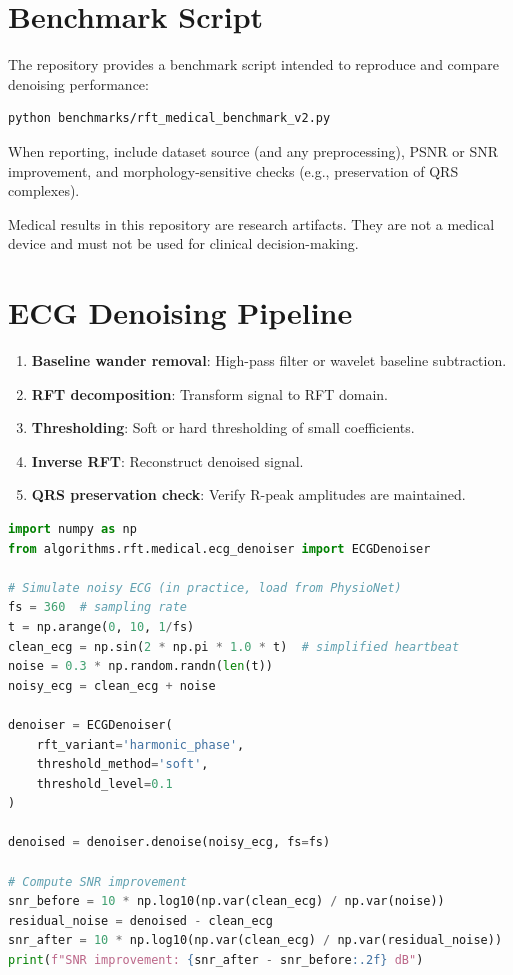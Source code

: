 \documentclass[11pt, a4paper, openany]{book}
\theoremstyle{definition}
\begin{document}
\section{Benchmark Script}
The repository provides a benchmark script intended to reproduce and compare denoising performance:
\begin{verbatim}
python benchmarks/rft_medical_benchmark_v2.py
\end{verbatim}
When reporting, include dataset source (and any preprocessing), PSNR or SNR improvement, and morphology-sensitive checks (e.g., preservation of QRS complexes).

\begin{warningbox}
Medical results in this repository are research artifacts. They are not a medical device and must not be used for clinical decision-making.
\end{warningbox}

\section{ECG Denoising Pipeline}
\begin{enumerate}
    \item \textbf{Baseline wander removal}: High-pass filter or wavelet baseline subtraction.
    \item \textbf{RFT decomposition}: Transform signal to RFT domain.
    \item \textbf{Thresholding}: Soft or hard thresholding of small coefficients.
    \item \textbf{Inverse RFT}: Reconstruct denoised signal.
    \item \textbf{QRS preservation check}: Verify R-peak amplitudes are maintained.
\end{enumerate}

\begin{lstlisting}[language=Python, caption={ECG Denoising Example}]
import numpy as np
from algorithms.rft.medical.ecg_denoiser import ECGDenoiser

# Simulate noisy ECG (in practice, load from PhysioNet)
fs = 360  # sampling rate
t = np.arange(0, 10, 1/fs)
clean_ecg = np.sin(2 * np.pi * 1.0 * t)  # simplified heartbeat
noise = 0.3 * np.random.randn(len(t))
noisy_ecg = clean_ecg + noise

denoiser = ECGDenoiser(
    rft_variant='harmonic_phase',
    threshold_method='soft',
    threshold_level=0.1
)

denoised = denoiser.denoise(noisy_ecg, fs=fs)

# Compute SNR improvement
snr_before = 10 * np.log10(np.var(clean_ecg) / np.var(noise))
residual_noise = denoised - clean_ecg
snr_after = 10 * np.log10(np.var(clean_ecg) / np.var(residual_noise))
print(f"SNR improvement: {snr_after - snr_before:.2f} dB")
\end{lstlisting}
\end{document}
